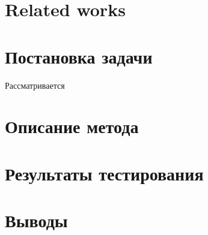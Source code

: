 \documentclass[a4paper]{article}
\begin{document}
\section{Related works}

\section{Постановка задачи}

Рассматривается 

\section{Описание метода}

\section{Результаты тестирования}

\section{Выводы}
\end{document}
